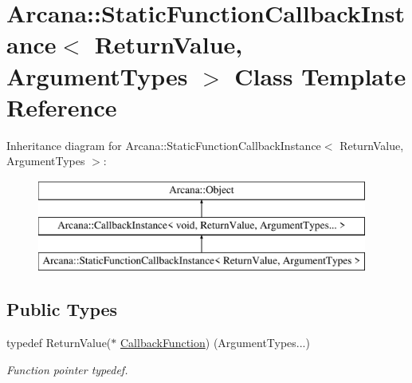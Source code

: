 \hypertarget{class_arcana_1_1_static_function_callback_instance}{}\section{Arcana\+:\+:Static\+Function\+Callback\+Instance$<$ Return\+Value, Argument\+Types $>$ Class Template Reference}
\label{class_arcana_1_1_static_function_callback_instance}
Inheritance diagram for Arcana\+:\+:Static\+Function\+Callback\+Instance$<$ Return\+Value, Argument\+Types $>$\+:\begin{figure}[H]
\begin{center}
\leavevmode
\includegraphics[height=3.000000cm]{class_arcana_1_1_static_function_callback_instance}
\end{center}
\end{figure}
\subsection*{Public Types}
\begin{DoxyCompactItemize}
\item 
\mbox{\label{class_arcana_1_1_static_function_callback_instance_a2df756266028ab7af5c4253fbfb230dc}} 
typedef Return\+Value($\ast$ \mbox{\hyperlink{class_arcana_1_1_static_function_callback_instance_a2df756266028ab7af5c4253fbfb230dc}{Callback\+Function}}) (Argument\+Types...)
\begin{DoxyCompactList}\small\item\em Function pointer typedef. \end{DoxyCompactList}\end{DoxyCompactItemize}
